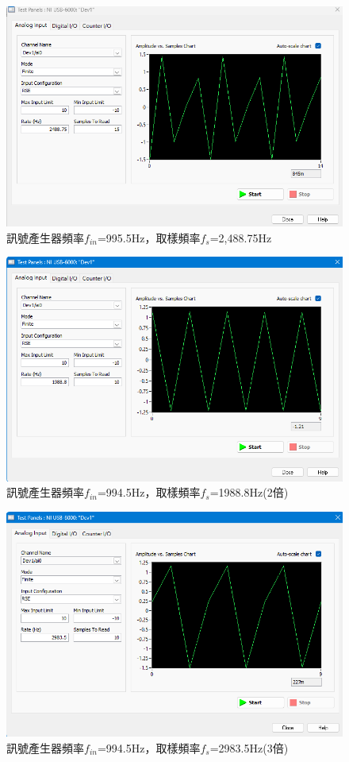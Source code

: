 \documentclass[12pt,a4paper]{article}
\begin{document}
\begin{CJK}{UTF8}{bkai}
\begin{figure}[h]
    \centering
    \includegraphics[width=0.7\linewidth]{figures/exp_4_3.png}
    \caption{訊號產生器頻率$f_{in}$=995.5Hz，取樣頻率$f_{s}$=2,488.75Hz}
    \label{fig:exp_4_3}
\end{figure}

\begin{figure}[h]
    \centering
    \includegraphics[width=0.7\linewidth]{figures/exp_4_4_1.png}
    \caption{訊號產生器頻率$f_{in}$=994.5Hz，取樣頻率$f_{s}$=1988.8Hz(2倍)}
    \label{fig:exp_4_4_1}
\end{figure}
\clearpage

\begin{figure}[h]
    \centering
    \includegraphics[width=0.7\linewidth]{figures/exp_4_4_2.png}
    \caption{訊號產生器頻率$f_{in}$=994.5Hz，取樣頻率$f_{s}$=2983.5Hz(3倍)}
    \label{fig:exp_4_4_2}
\end{figure}


\end{CJK}
\end{document}
